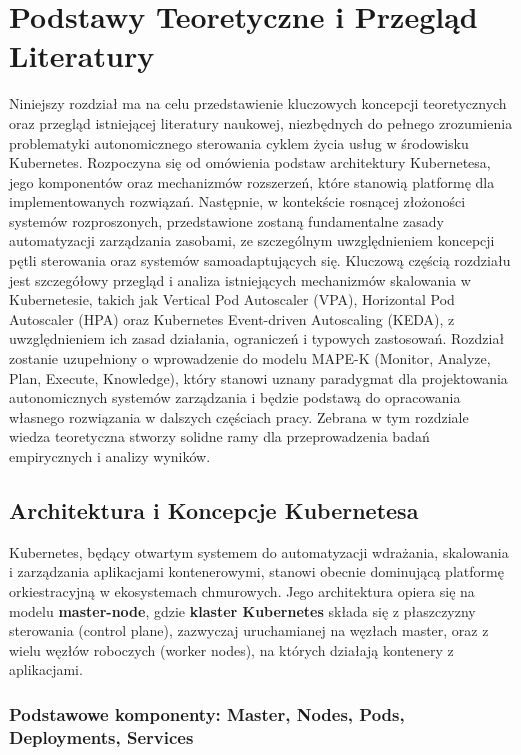 \newpage

\section{Podstawy Teoretyczne i Przegląd Literatury}

Niniejszy rozdział ma na celu przedstawienie kluczowych koncepcji teoretycznych oraz przegląd istniejącej literatury naukowej, niezbędnych do pełnego zrozumienia problematyki autonomicznego sterowania cyklem życia usług w środowisku Kubernetes. Rozpoczyna się od omówienia podstaw architektury Kubernetesa, jego komponentów oraz mechanizmów rozszerzeń, które stanowią platformę dla implementowanych rozwiązań. Następnie, w kontekście rosnącej złożoności systemów rozproszonych, przedstawione zostaną fundamentalne zasady automatyzacji zarządzania zasobami, ze szczególnym uwzględnieniem koncepcji pętli sterowania oraz systemów samoadaptujących się. Kluczową częścią rozdziału jest szczegółowy przegląd i analiza istniejących mechanizmów skalowania w Kubernetesie, takich jak Vertical Pod Autoscaler (VPA), Horizontal Pod Autoscaler (HPA) oraz Kubernetes Event-driven Autoscaling (KEDA), z uwzględnieniem ich zasad działania, ograniczeń i typowych zastosowań. Rozdział zostanie uzupełniony o wprowadzenie do modelu MAPE-K (Monitor, Analyze, Plan, Execute, Knowledge), który stanowi uznany paradygmat dla projektowania autonomicznych systemów zarządzania i będzie podstawą do opracowania własnego rozwiązania w dalszych częściach pracy. Zebrana w tym rozdziale wiedza teoretyczna stworzy solidne ramy dla przeprowadzenia badań empirycznych i analizy wyników.

\subsection{Architektura i Koncepcje Kubernetesa}

Kubernetes, będący otwartym systemem do automatyzacji wdrażania, skalowania i zarządzania aplikacjami kontenerowymi, stanowi obecnie dominującą platformę orkiestracyjną w ekosystemach chmurowych. Jego architektura opiera się na modelu \textbf{master-node}, gdzie \textbf{klaster Kubernetes} składa się z płaszczyzny sterowania (control plane), zazwyczaj uruchamianej na węzłach master, oraz z wielu węzłów roboczych (worker nodes), na których działają kontenery z aplikacjami.


\subsubsection{Podstawowe komponenty: Master, Nodes, Pods, Deployments, Services}

